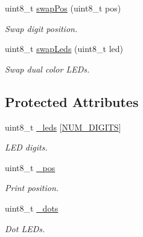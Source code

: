 \begin{DoxyCompactItemize}
uint8\+\_\+t \hyperlink{class_l_k_m1638_board_a36bc06324f7f4bb412d42338e4adfb18}{swap\+Pos} (uint8\+\_\+t pos)
\begin{DoxyCompactList}\small\item\em Swap digit position. \end{DoxyCompactList}\item 
uint8\+\_\+t \hyperlink{class_l_k_m1638_board_a9526953f337a0f5780c963f5e37a77d3}{swap\+Leds} (uint8\+\_\+t led)
\begin{DoxyCompactList}\small\item\em Swap dual color L\+ED\textquotesingle{}s. \end{DoxyCompactList}\end{DoxyCompactItemize}
\subsection*{Protected Attributes}
\begin{DoxyCompactItemize}
\item 
uint8\+\_\+t \hyperlink{class_l_k_m1638_board_ad0ecb25b0069693153b4c99b1fd0c0c6}{\+\_\+leds} \mbox{[}\hyperlink{_erriez_l_k_m1638_board_8h_a0b79fa1bdb1363440df485691386a74c}{N\+U\+M\+\_\+\+D\+I\+G\+I\+TS}\mbox{]}\hypertarget{class_l_k_m1638_board_ad0ecb25b0069693153b4c99b1fd0c0c6}{}\label{class_l_k_m1638_board_ad0ecb25b0069693153b4c99b1fd0c0c6}

\begin{DoxyCompactList}\small\item\em L\+ED digits. \end{DoxyCompactList}\item 
uint8\+\_\+t \hyperlink{class_l_k_m1638_board_a1dc0720aa961510a147cb7e3db7d7873}{\+\_\+pos}\hypertarget{class_l_k_m1638_board_a1dc0720aa961510a147cb7e3db7d7873}{}\label{class_l_k_m1638_board_a1dc0720aa961510a147cb7e3db7d7873}

\begin{DoxyCompactList}\small\item\em Print position. \end{DoxyCompactList}\item 
uint8\+\_\+t \hyperlink{class_l_k_m1638_board_a2de77cd6c33672edb5a3288b09cdcbfc}{\+\_\+dots}\hypertarget{class_l_k_m1638_board_a2de77cd6c33672edb5a3288b09cdcbfc}{}\label{class_l_k_m1638_board_a2de77cd6c33672edb5a3288b09cdcbfc}

\begin{DoxyCompactList}\small\item\em Dot L\+ED\textquotesingle{}s. \end{DoxyCompactList}\end{DoxyCompactItemize}


